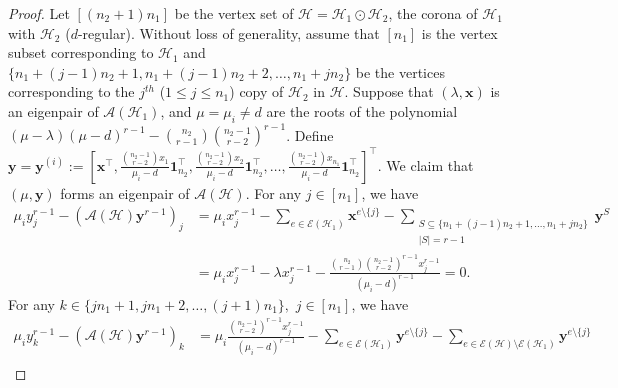 \documentclass[10pt,a4paper]{amsart}
\begin{document}
	\begin{proof}
		Let $[(n_2+1)n_1]$ be the vertex set of $\mathcal{H} = \mathcal{H}_1 \odot \mathcal{H}_2$, the corona of $\mathcal{H}_1$ with $\mathcal{H}_2$ ($d$-regular). Without loss of generality, assume that $[n_1]$ is the vertex subset corresponding to $\mathcal{H}_1$ and $\{  n_1 + (j-1)n_2+ 1, n_1 + (j-1)n_2+ 2,\ldots, n_1+jn_2\}$ be the vertices corresponding to the $j^{th}$ ($1 \leq j \leq n_1$) copy of $\mathcal{H}_2$ in $\mathcal{H}$. Suppose that $(\lambda,\mathbf{x})$ is an eigenpair of $\mathcal{A}(\mathcal{H}_1)$, and $\mu=\mu_i \neq d$ are the roots of the polynomial $(\mu-\lambda)(\mu-d)^{r-1}-\binom{n_2}{r-1}\binom{n_2-1}{r-2}^{r-1}$.
		Define $\mathbf{y}=\mathbf{y}^{(i)}:=\left[\mathbf{x}^\intercal, \frac{\binom{n_2-1}{r-2}x_1}{\mu_i-d} \mathbf{1}_{n_2}^\intercal, \frac{\binom{n_2-1}{r-2}x_2}{\mu_i-d} \mathbf{1}_{n_2}^\intercal, \ldots,  \frac{\binom{n_2-1}{r-2}x_{n_1}}{\mu_i-d} \mathbf{1}_{n_2}^\intercal \right]^{\intercal}$.
		We claim that $(\mu, \mathbf{y})$ 
		forms an eigenpair of $\mathcal{A}(\mathcal{H})$. 
		For any $j \in [n_1]$, we have 
		\begin{align*}
			\mu_i y_j^{r-1}- (\mathcal{A}(\mathcal{H})\mathbf{y}^{r-1})_j 
			&=  \mu_i x_j^{r-1}-\sum\limits_{e \in \mathcal{E}(\mathcal{H}_1)} \mathbf{x}^{e\setminus \{ j \}} - \sum\limits_{\substack{S \subseteq \{ n_1 + (j-1)n_2+ 1,\ldots, n_1+jn_2\}\\ |S|=r-1}} \mathbf{y}^{S} \\
			&=  \mu_i x_j^{r-1}-\lambda x_j^{r-1} - \frac{\binom{n_2}{r-1}\binom{n_2-1}{r-2}^{r-1} x_j^{r-1}}{(\mu_i-d)^{r-1}} =0.
		\end{align*}
		For any $k \in \{ j n_1+ 1, j n_1+2,\ldots, (j+1)n_1\},$ $j \in [n_1]$, we have 
		\begin{align*}
			\mu_i y_k^{r-1} - (\mathcal{A}(\mathcal{H})\mathbf{y}^{r-1})_k 
			&= \mu_i \frac{\binom{n_2-1}{r-2}^{r-1} x_j^{r-1}}{(\mu_i-d)^{r-1}} - \sum\limits_{e \in \mathcal{E}(\mathcal{H}_1)} \mathbf{y}^{e\setminus \{ j \}} - \sum\limits_{e \in \mathcal{E}(\mathcal{H}) \setminus \mathcal{E}(\mathcal{H}_1)} \mathbf{y}^{e\setminus \{ j \}} \\

\end{align*}
\end{proof}
\end{document}
